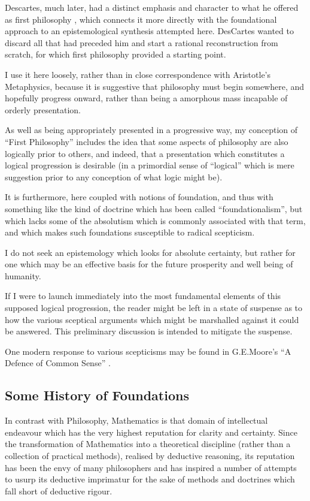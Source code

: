 \documentclass[10pt,titlepage]{book}
\begin{document}
Descartes, much later, had a distinct emphasis and character to what he offered as first philosophy \cite{descartes2013meditations}, which connects it more directly with the foundational approach to an epistemological synthesis attempted here.
DesCartes wanted to discard all that had preceded him and start a rational reconstruction from scratch, for which first philosophy provided a starting point.

I use it here loosely, rather than in close correspondence with Aristotle's Metaphysics, because it is suggestive that philosophy must begin somewhere, and hopefully progress onward, rather than being a amorphous mass incapable of orderly presentation.

As well as being appropriately presented in a progressive way, my conception of ``First Philosophy'' includes the idea that some aspects of philosophy are also logically prior to others, and indeed, that a presentation which constitutes a logical progression is desirable (in a primordial sense of ``logical'' which is mere suggestion prior to any conception of what logic might be).

It is furthermore, here coupled with notions of foundation, and thus with something like the kind of doctrine which has been called ``foundationalism'', but which lacks some of the absolutism which is commonly associated with that term, and which makes such foundations susceptible to radical scepticism.

I do not seek an epistemology which looks for absolute certainty, but rather for one which may be an effective basis for the future prosperity and well being of humanity.

If I were to launch immediately into the most fundamental elements of this supposed logical progression, the reader might be left in a state of suspense as to how the various sceptical arguments which might be marshalled against it could be answered.
This preliminary discussion is intended to mitigate the suspense.

One modern response to various scepticisms may be found in G.E.Moore's ``A Defence of Common Sense'' \cite{moore1925,moore1993}.

\subsection{Some History of Foundations}

In contrast with Philosophy, Mathematics is that domain of intellectual endeavour which has the very highest reputation for clarity and certainty.
Since the transformation of Mathematics into a theoretical discipline (rather than a collection of practical methods), realised by deductive reasoning, its reputation has been the envy of many philosophers and has inspired a number of attempts to usurp its deductive imprimatur for the sake of methods and doctrines which fall short of deductive rigour.
\end{document}
